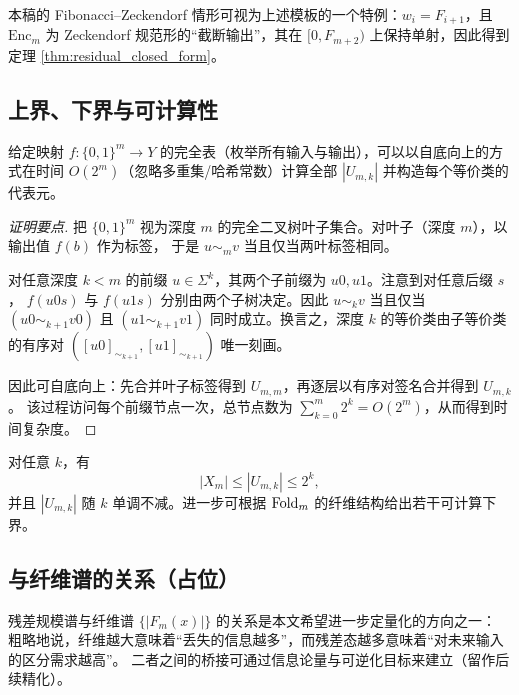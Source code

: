 \begin{remark}
本稿的 Fibonacci--Zeckendorf 情形可视为上述模板的一个特例：$w_i=F_{i+1}$，且 $\mathrm{Enc}_m$ 为
Zeckendorf 规范形的“截断输出”，其在 $[0,F_{m+2})$ 上保持单射，因此得到定理 \ref{thm:residual_closed_form}。
\end{remark}

\subsection{上界、下界与可计算性}
\begin{theorem}\label{thm:bottom_up}
给定映射 $f:\{0,1\}^m\to Y$ 的完全表（枚举所有输入与输出），可以以自底向上的方式在时间
$O(2^m)$（忽略多重集/哈希常数）计算全部 $|U_{m,k}|$ 并构造每个等价类的代表元。
\end{theorem}

\begin{proof}[证明要点]
把 $\{0,1\}^m$ 视为深度 $m$ 的完全二叉树叶子集合。对叶子（深度 $m$），以输出值 $f(b)$ 作为标签，
于是 $u\sim_m v$ 当且仅当两叶标签相同。

对任意深度 $k<m$ 的前缀 $u\in\Sigma^k$，其两个子前缀为 $u0,u1$。注意到对任意后缀 $s$，
$f(u0s)$ 与 $f(u1s)$ 分别由两个子树决定。因此 $u\sim_k v$ 当且仅当
$(u0\sim_{k+1} v0)$ 且 $(u1\sim_{k+1} v1)$ 同时成立。换言之，深度 $k$ 的等价类由子等价类的有序对
$( [u0]_{\sim_{k+1}}, [u1]_{\sim_{k+1}} )$ 唯一刻画。

因此可自底向上：先合并叶子标签得到 $U_{m,m}$，再逐层以有序对签名合并得到 $U_{m,k}$。
该过程访问每个前缀节点一次，总节点数为 $\sum_{k=0}^{m}2^k=O(2^m)$，从而得到时间复杂度。
\end{proof}

\begin{theorem}[规模界（占位）]\label{thm:size_bounds}
对任意 $k$，有
\[
|X_m|\le |U_{m,k}|\le 2^k,
\]
并且 $|U_{m,k}|$ 随 $k$ 单调不减。进一步可根据 $\mathrm{Fold}_m$ 的纤维结构给出若干可计算下界。
\end{theorem}

\subsection{与纤维谱的关系（占位）}
残差规模谱与纤维谱 $\{|F_m(x)|\}$ 的关系是本文希望进一步定量化的方向之一：
粗略地说，纤维越大意味着“丢失的信息越多”，而残差态越多意味着“对未来输入的区分需求越高”。
二者之间的桥接可通过信息论量与可逆化目标来建立（留作后续精化）。

